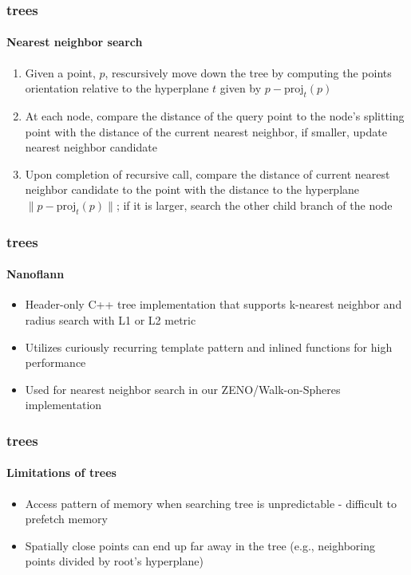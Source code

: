 \begin{frame}
  \frametitle{\kd trees}
  \framesubtitle{Nearest neighbor search}

  \begin{enumerate}
    \item Given a point, $p$, rescursively move down the tree by computing the points orientation relative to the 
      hyperplane $t$ given by $p - \text{proj}_t(p)$
    \item At each node, compare the distance of the query point to the node's splitting point with the distance
      of the current nearest neighbor, if smaller, update nearest neighbor candidate
    \item Upon completion of recursive call, compare the distance of current nearest neighbor 
      candidate to the point with the distance to the hyperplane $\|p - \text{proj}_t(p)\|$; 
      if it is larger, search the other child branch of the node
  \end{enumerate}

\end{frame}

\begin{frame}
  \frametitle{\kd trees}
  \framesubtitle{Nanoflann}

  \begin{itemize}
    \item Header-only C++ \kd tree implementation that supports k-nearest neighbor and radius search with 
      L1 or L2 metric
    \item Utilizes curiously recurring template pattern and inlined functions for high performance
    \item Used for nearest neighbor search in our ZENO/Walk-on-Spheres implementation 
  \end{itemize}

\end{frame}


\begin{frame}
  \frametitle{\kd trees}
  \framesubtitle{Limitations of trees}

  \begin{itemize}
    \item Access pattern of memory when searching tree is unpredictable - difficult to prefetch memory
    \item Spatially close points can end up far away in the tree (e.g., neighboring points divided by 
      root's hyperplane)
  \end{itemize}
\end{frame}

